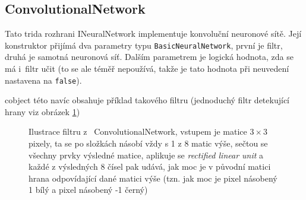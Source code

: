 \documentclass[12pt]{report}			%
\newcommand{\glsref}[1]{\glsdisp{#1}{\phantom{}}}
\begin{document}
				\subsection{ConvolutionalNetwork}
					Tato \gls{trida} \gls{rozhrani} INeuralNetwork implementuje konvoluční neuronové sítě. Její konstruktor přijímá dva parametry \gls{typ}u \verb!BasicNeuralNetwork!, první je filtr, druhá je samotná neuronová síť. Dalším parametrem je logická hodnota, zda se má i~filtr učit (to se ale téměř nepoužívá, takže je tato hodnota při neuvedení nastavena na \glsref{false}\verb!false!).
					
					\Gls{cobject} této  navíc obsahuje příklad takového filtru (jednoduchý filtr detekující hrany viz obrázek \ref{fig:filter})
					\begin{figure}
						\caption{Ilustrace filtru z~ ConvolutionalNetwork, vstupem je matice $3\times 3$ pixely, ta se po složkách násobí vždy s 1 z 8 matic výše, sečtou se všechny prvky výsledné matice, aplikuje se \emph{rectified linear unit} a každé z výsledných 8 čísel pak udává, jak moc je v původní matici hrana odpovídající dané matici výše (tzn. jak moc je pixel násobený 1 bílý a pixel násobený -1 černý)}
						\label{fig:filter}
					\end{figure}
			
\end{document}
